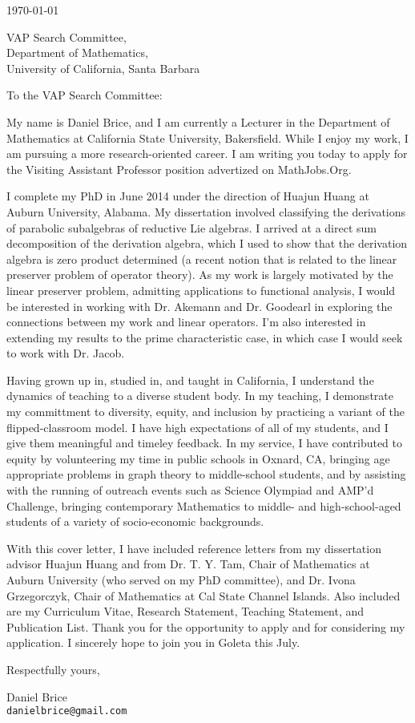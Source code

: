 \documentclass[11pt]{article}
\begin{document}
\makeletterhead

\vfill

\today

\vfill

VAP Search Committee,\\
Department of Mathematics,\\
University of California, Santa Barbara

\vfill

To the VAP Search Committee:

\vfill

My name is Daniel Brice, and I am currently a Lecturer in the Department
of Mathematics at California State University, Bakersfield. While I
enjoy my work, I am pursuing a more research-oriented career. I am
writing you today to apply for the Visiting Assistant Professor position
advertized on MathJobs.Org.

I complete my PhD in June 2014 under the direction of Huajun Huang at
Auburn University, Alabama. My dissertation involved classifying the
derivations of parabolic subalgebras of reductive Lie algebras. I
arrived at a direct sum decomposition of the derivation algebra, which I
used to show that the derivation algebra is zero product determined (a
recent notion that is related to the linear preserver problem of
operator theory).
As my work is largely motivated by the linear preserver problem,
admitting applications to functional analysis, I would be interested in
working with Dr. Akemann and Dr. Goodearl in exploring the connections
between my work and linear operators. I'm also interested in extending
my results to the prime characteristic case, in which case I would seek
to work with Dr. Jacob.

Having grown up in, studied in, and taught in California, I
understand the dynamics of teaching to a diverse student body. In my
teaching, I demonstrate my committment to diversity, equity, and
inclusion by practicing a variant of the flipped-classroom model. I have
high expectations of all of my students, and I give them meaningful and
timeley feedback. In my service, I have contributed to equity by
volunteering my time in public schools in Oxnard, CA, bringing age
appropriate problems in graph theory to middle-school students, and by
assisting with the running of outreach events such as Science Olympiad
and AMP'd Challenge, bringing contemporary Mathematics to middle- and
high-school-aged students of a variety of socio-economic backgrounds.

With this cover letter, I have included reference letters from my
dissertation advisor Huajun Huang and from Dr. T. Y. Tam, Chair of
Mathematics at Auburn University (who served on my PhD committee), and
Dr. Ivona Grzegorczyk, Chair of Mathematics at Cal State Channel
Islands. Also included are my Curriculum Vitae, Research Statement,
Teaching Statement, and Publication List. Thank you for the opportunity
to apply and for considering my application. I sincerely hope to join
you in Goleta this July.

\vfill

Respectfully yours,

\vfill

Daniel Brice\\
\texttt{danielbrice@gmail.com}

\label{page:last}
\end{document}

